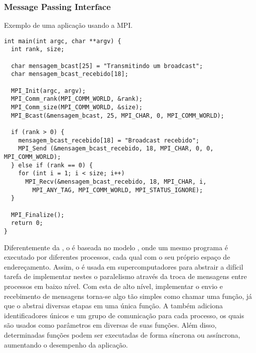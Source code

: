 \subsubsection{Message Passing Interface}
\label{sec:mpi}

\begin{listing}[tb]
\caption{Exemplo de uma aplicação usando a MPI.}
\label{lst:programmpi}
\begin{verbatim}
int main(int argc, char **argv) {
  int rank, size;

  char mensagem_bcast[25] = "Transmitindo um broadcast";
  char mensagem_bcast_recebido[18];

  MPI_Init(argc, argv);
  MPI_Comm_rank(MPI_COMM_WORLD, &rank);
  MPI_Comm_size(MPI_COMM_WORLD, &size);
  MPI_Bcast(&mensagem_bcast, 25, MPI_CHAR, 0, MPI_COMM_WORLD);

  if (rank > 0) {
    mensagem_bcast_recebido[18] = "Broadcast recebido";
    MPI_Send (&mensagem_bcast_recebido, 18, MPI_CHAR, 0, 0, MPI_COMM_WORLD);
  } else if (rank == 0) {
    for (int i = 1; i < size; i++)
      MPI_Recv(&mensagem_bcast_recebido, 18, MPI_CHAR, i, 
        MPI_ANY_TAG, MPI_COMM_WORLD, MPI_STATUS_IGNORE);
  }

  MPI_Finalize();
  return 0;
}
\end{verbatim}
\end{listing}

Diferentemente da \OpenMP, o \MPI é baseada no modelo \textit{\SPMD}, onde um mesmo programa é executado por diferentes processos, cada qual com o seu próprio espaço de endereçamento. Assim, o \MPI é usada em supercomputadores para abstrair a difícil tarefa de implementar nestes o paralelismo através da troca de mensagens entre processos em baixo nível. Com esta \API de alto nível, implementar o envio e recebimento de mensagens torna-se algo tão simples como chamar uma função, já que o \MPI abstrai diversas etapas em uma única função. A \API também adiciona identificadores únicos e um grupo de comunicação para cada processo, os quais são usados como parâmetros em diversas de suas funções. Além disso, determinadas funções podem ser executadas de forma síncrona ou assíncrona, aumentando o desempenho da aplicação.


